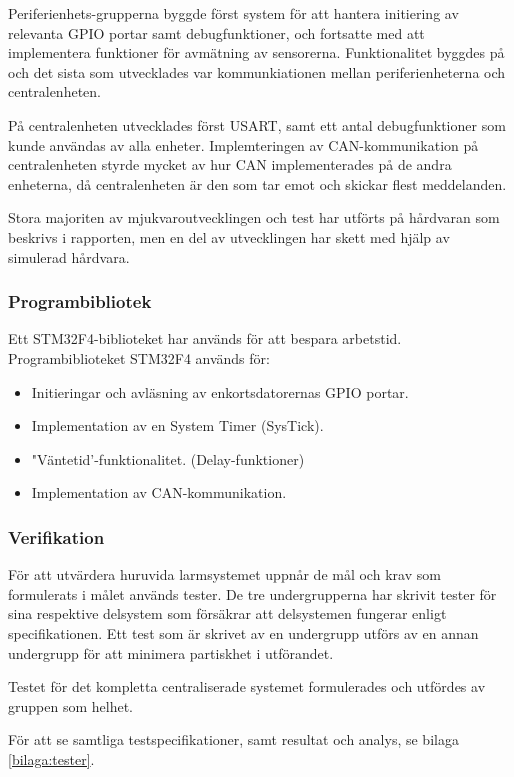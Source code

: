 \documentclass{article}
\begin{document}
Periferienhets-grupperna byggde först system för att hantera initiering av relevanta GPIO portar samt debugfunktioner, och fortsatte med att implementera funktioner för avmätning av sensorerna. Funktionalitet byggdes på och det sista som utvecklades var kommunkiationen mellan periferienheterna och centralenheten.

På centralenheten utvecklades först USART, samt ett antal debugfunktioner som kunde användas av alla enheter. Implemteringen av CAN-kommunikation på centralenheten styrde mycket av hur CAN implementerades på de andra enheterna, då centralenheten är den som tar emot och skickar flest meddelanden.

Stora majoriten av mjukvaroutvecklingen och test har utförts på hårdvaran som beskrivs i rapporten, men en del av utvecklingen har skett med hjälp av simulerad hårdvara.

\subsubsection{Programbibliotek}
\label{stm}
Ett STM32F4-biblioteket har används för att bespara arbetstid.
Programbiblioteket STM32F4\cite{stm} används för:
\begin{itemize}
    \item Initieringar och avläsning av enkortsdatorernas GPIO portar.
    \item Implementation av en System Timer (SysTick).
    \item "Väntetid'-funktionalitet. (Delay-funktioner)
    \item Implementation av CAN-kommunikation.
\end{itemize}



\subsubsection{Verifikation}
\label{verifikation}
För att utvärdera huruvida larmsystemet uppnår de mål och krav som formulerats i målet används tester.
De tre undergrupperna har skrivit tester för sina respektive delsystem som försäkrar att
delsystemen fungerar enligt specifikationen. Ett test som är skrivet av en undergrupp utförs
av en annan undergrupp för att minimera partiskhet i utförandet.

Testet för det kompletta centraliserade systemet formulerades och utfördes av gruppen som helhet.

För att se samtliga testspecifikationer, samt resultat och analys, se bilaga \ref{bilaga:tester}.
\end{document}
